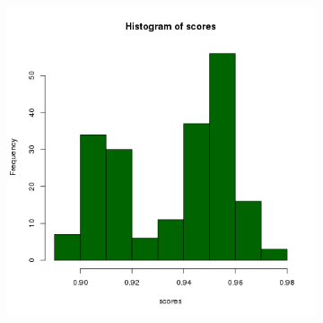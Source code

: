 \documentclass[11pt,a4paper]{article}
\begin{document}
\begin{figure}[H]
\begin{subfigure}{.5\textwidth}
        \includegraphics[width=\textwidth]{images/hist-freq-n7-a43-chrome-200-amostras-20131120}
        \label{nexus43histograma200}
    \end{subfigure}
\end{figure}
\end{document}
